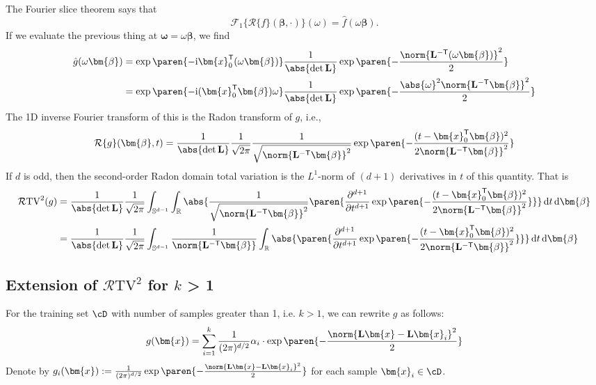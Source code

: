 The Fourier slice theorem says that
\[
    \mathcal{F}_1\{\mathcal{R}\{f\}(\bm{\beta}, \cdot)\}(\omega) = \hat{f}(\omega\bm{\beta}).
\]
If we evaluate the previous thing at $\bm{\omega} = \omega\bm{\beta}$, we find
\begin{align*}
\hat{g}(\omega\bm{\beta})
&= \exp\paren{-\mathrm{i}\bm{x}_0^\mathsf{T}(\omega\bm{\beta})} \frac{1}{\abs{\det \mathbf{L}}} \exp\paren{-\frac{\norm{\mathbf{L}^{-\mathsf{T}} (\omega\bm{\beta})}^2}{2}} \\
&= \exp\paren{-\mathrm{i}(\bm{x}_0^\mathsf{T}\bm{\beta})\omega} \frac{1}{\abs{\det \mathbf{L}}} \exp\paren{-\frac{\abs{\omega}^2\norm{\mathbf{L}^{-\mathsf{T}} \bm{\beta}}^2}{2}} \\
\end{align*}
The 1D inverse Fourier transform of this is the Radon transform of $g$, i.e.,
\[
    \mathcal{R}\{g\}(\bm{\beta}, t) = \frac{1}{\abs{\det \mathbf{L}}} \frac{1}{\sqrt{2\pi}} \frac{1}{\sqrt{\norm{\mathbf{L}^{-\mathsf{T}}\bm{\beta}}^2}} \exp\paren{-\frac{(t- \bm{x}_0^\mathsf{T}\bm{\beta})^2}{2\norm{\mathbf{L}^{-\mathsf{T}}\bm{\beta}}^2}}
\]
If $d$ is odd, then the second-order Radon domain total variation is the $L^1$-norm of $(d+1)$ derivatives in $t$ of this quantity. That is
\begin{align}
    \mathcal{R}\mathrm{TV}^2(g)
    &= \frac{1}{\abs{\det \mathbf{L}}} \frac{1}{\sqrt{2\pi}} \int_{\mathbb{S}^{d-1}} \int_\mathbb{R}\abs{\frac{1}{\sqrt{\norm{\mathbf{L}^{-\mathsf{T}}\bm{\beta}}^2}} \paren{\frac{\partial^{d+1}}{\partial t^{d+1}} \exp\paren{-\frac{(t-\bm{x}_0^\mathsf{T}\bm{\beta})^2}{2\norm{\mathbf{L}^{-\mathsf{T}}\bm{\beta}}^2}}}} \,\mathrm{d}t\,\mathrm{d}\bm{\beta} \label{eq: rtv1}\\
    &= \frac{1}{\abs{\det \mathbf{L}}} \frac{1}{\sqrt{2\pi}} \int_{\mathbb{S}^{d-1}} \frac{1}{{\norm{\mathbf{L}^{-\mathsf{T}}\bm{\beta}}}} 
    \int_\mathbb{R}
    \abs{ \paren{\frac{\partial^{d+1}}{\partial t^{d+1}} \exp\paren{-\frac{(t-\bm{x}_0^\mathsf{T}\bm{\beta})^2}{2\norm{\mathbf{L}^{-\mathsf{T}}\bm{\beta}}^2}}}} \,\mathrm{d}t\,\mathrm{d}\bm{\beta} \label{eq: rtv2}
\end{align}

\subsection{Extension of $\mathcal{R}\mathrm{TV}^2$ for $k$ > 1}
For the training set $\cD$ with number of samples greater than 1, i.e. $k > 1$, we can rewrite $g$ as follows:
\[
g(\bm{x}) = \sum_{i =1}^k \frac{1}{(2\pi)^{d/2}}  \alpha_i \cdot \exp\paren{-\frac{\norm{\mathbf{L}\bm{x} - \mathbf{L}\bm{x}_i}^2}{2}}
\]
Denote by $g_i(\bm{x}) := \frac{1}{(2\pi)^{d/2}} \exp\paren{-\frac{\norm{\mathbf{L}\bm{x} - \mathbf{L}\bm{x}_i}^2}{2}}$ for each sample $\bm{x}_i \in \cD$.

